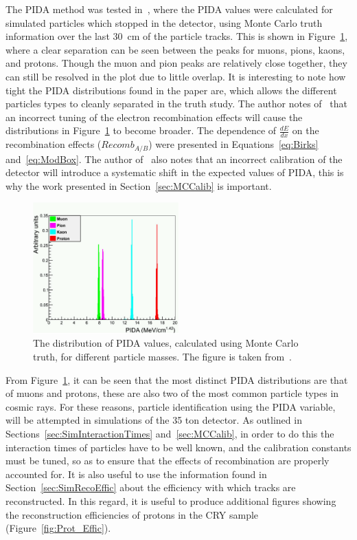 The PIDA method was tested in~\citep{PIDA_Paper}, where the PIDA values were calculated for simulated particles which stopped in the detector, using Monte Carlo truth information over the last 30~cm of the particle tracks. This is shown in Figure~\ref{fig:PIDA_MC}, where a clear separation can be seen between the peaks for muons, pions, kaons, and protons. Though the muon and pion peaks are relatively close together, they can still be resolved in the plot due to little overlap. It is interesting to note how tight the PIDA distributions found in the paper are, which allows the different particles types to cleanly separated in the truth study. The author notes of~\citep{PIDA_Paper} that an incorrect tuning of the electron recombination effects will cause the distributions in Figure~\ref{fig:PIDA_MC} to become broader. The dependence of $\frac{dE}{dx}$ on the recombination effects ($Recomb_{A/B}$) were presented in Equations~\ref{eq:Birks} and~\ref{eq:ModBox}. The author of~\citep{PIDA_Paper} also notes that an incorrect calibration of the detector will introduce a systematic shift in the expected values of PIDA, this is why the work presented in Section~\ref{sec:MCCalib} is important. \\

\begin{figure}
  \centering
  \includegraphics[width=0.5\textwidth]{TruthPIDA}
  \caption[The distribution of PIDA values, calculated using Monte Carlo truth, for different particle masses]
          {The distribution of PIDA values, calculated using Monte Carlo truth, for different particle masses. The figure is taken from~\citep{PIDA_Paper}.}
  \label{fig:PIDA_MC}
\end{figure}

From Figure~\ref{fig:PIDA_MC}, it can be seen that the most distinct PIDA distributions are that of muons and protons, these are also two of the most common particle types in cosmic rays. For these reasons, particle identification using the PIDA variable, will be attempted in simulations of the 35 ton detector. As outlined in Sections~\ref{sec:SimInteractionTimes} and~\ref{sec:MCCalib}, in order to do this the interaction times of particles have to be well known, and the calibration constants must be tuned, so as to ensure that the effects of recombination are properly accounted for. It is also useful to use the information found in Section~\ref{sec:SimRecoEffic} about the efficiency with which tracks are reconstructed. In this regard, it is useful to produce additional figures showing the reconstruction efficiencies of protons in the CRY sample (Figure~\ref{fig:Prot_Effic}).\\

